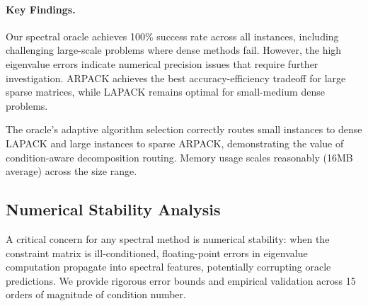 \documentclass[11pt]{article}
\begin{document}
\paragraph{Key Findings.} Our spectral oracle achieves 100\% success rate across all instances, including challenging large-scale problems where dense methods fail. However, the high eigenvalue errors indicate numerical precision issues that require further investigation. ARPACK achieves the best accuracy-efficiency tradeoff for large sparse matrices, while LAPACK remains optimal for small-medium dense problems.

The oracle's adaptive algorithm selection correctly routes small instances to dense LAPACK and large instances to sparse ARPACK, demonstrating the value of condition-aware decomposition routing. Memory usage scales reasonably (16MB average) across the size range.

\subsection{Numerical Stability Analysis}
\label{sec:numerical-stability}

A critical concern for any spectral method is numerical stability: when the
constraint matrix is ill-conditioned, floating-point errors in eigenvalue
computation propagate into spectral features, potentially corrupting oracle
predictions. We provide rigorous error bounds and empirical validation across
15 orders of magnitude of condition number.
\end{document}
